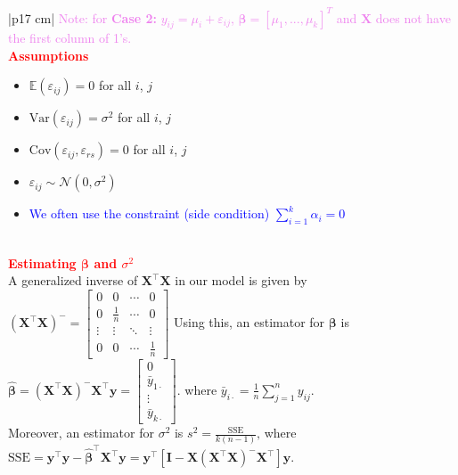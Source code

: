 \documentclass[a4paper,11pt]{article}
\begin{document}
\begin{longtable}{|p{17 cm}|}
\textcolor{violet}{Note: for \textbf{Case 2:} $y_{ij}=\mu_i+\varepsilon_{ij}$, $\boldsymbol{\beta}=[\mu_1,...,\mu_k]^T$ and $\boldsymbol{X}$ does not have the first column of 1's.} 
\\
\hline
\textbf{\textcolor{red}{Assumptions}}\\
\begin{minipage}{\linewidth} 
\begin{itemize}[noitemsep, topsep=0pt]
    \item $\mathbb{E}(\varepsilon_{ij})=0$ for all $i$, $j$
    \item $\text{Var}(\varepsilon_{ij})=\sigma^2$ for all $i$, $j$ 
    \item $\text{Cov}(\varepsilon_{ij},\varepsilon_{rs})=0$ for all $i$, $j$
    \item $\varepsilon_{ij}\sim\mathcal{N}(0,\sigma^2)$
    \item \textcolor{blue}{We often use the constraint (side condition) $\sum_{i=1}^k \alpha_i=0$}
\end{itemize}
\end{minipage} \\
\hline
\textbf{\textcolor{red}{Estimating $\boldsymbol{\beta}$ and $\sigma^2$}}\\
A generalized inverse of $\mathbf{X}^\top\mathbf{X}$ in our model is given by
$(\mathbf{X}^\top\mathbf{X})^-=\begin{bmatrix}
    0 & 0 & \cdots & 0 \\
    0 & \frac{1}{n} & \cdots & 0 \\
    \vdots & \vdots & \ddots & \vdots \\
    0 & 0 & \cdots & \frac{1}{n}
\end{bmatrix}$
Using this, an estimator for $\boldsymbol{\beta}$ is
$\hat{\boldsymbol{\beta}}=(\mathbf{X}^\top\mathbf{X})^-\mathbf{X}^\top\mathbf{y}=\begin{bmatrix}
    0 \\
    \bar{y}_{1\cdot} \\
    \vdots \\
    \bar{y}_{k\cdot}
\end{bmatrix}\text{.}$
where $\bar{y}_{i\cdot}=\frac{1}{n}\sum_{j=1}^ny_{ij}$.\\

Moreover, an estimator for $\sigma^2$ is
$s^2=\frac{\text{SSE}}{k(n-1)}\text{,}$
where $\text{SSE}=\mathbf{y}^\top\mathbf{y}-\hat{\boldsymbol{\beta}}^\top\mathbf{X}^\top\mathbf{y}=\mathbf{y}^\top[\mathbf{I}-\mathbf{X}(\mathbf{X}^\top\mathbf{X})^-\mathbf{X}^\top]\mathbf{y}$.\\


\end{longtable}
\end{document}
